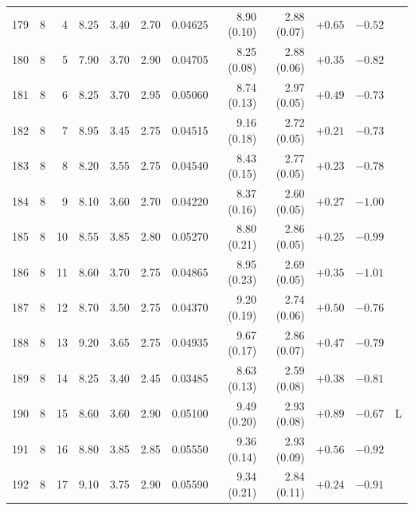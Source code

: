 \begin{longtable}{@{}rrrrrrrrrrrr@{}}
179 & 8 & 4 & \num{8.25} & \num{3.40} & \num{2.70} & \num{0.04625} & \num{8.90} (\num{0.10}) & \num{2.88} (\num{0.07}) & $+\num{0.65}$ & $-\num{0.52}$ &  \\
180 & 8 & 5 & \num{7.90} & \num{3.70} & \num{2.90} & \num{0.04705} & \num{8.25} (\num{0.08}) & \num{2.88} (\num{0.06}) & $+\num{0.35}$ & $-\num{0.82}$ &  \\
181 & 8 & 6 & \num{8.25} & \num{3.70} & \num{2.95} & \num{0.05060} & \num{8.74} (\num{0.13}) & \num{2.97} (\num{0.05}) & $+\num{0.49}$ & $-\num{0.73}$ &  \\
182 & 8 & 7 & \num{8.95} & \num{3.45} & \num{2.75} & \num{0.04515} & \num{9.16} (\num{0.18}) & \num{2.72} (\num{0.05}) & $+\num{0.21}$ & $-\num{0.73}$ &  \\
183 & 8 & 8 & \num{8.20} & \num{3.55} & \num{2.75} & \num{0.04540} & \num{8.43} (\num{0.15}) & \num{2.77} (\num{0.05}) & $+\num{0.23}$ & $-\num{0.78}$ &  \\
184 & 8 & 9 & \num{8.10} & \num{3.60} & \num{2.70} & \num{0.04220} & \num{8.37} (\num{0.16}) & \num{2.60} (\num{0.05}) & $+\num{0.27}$ & $-\num{1.00}$ &  \\
185 & 8 & 10 & \num{8.55} & \num{3.85} & \num{2.80} & \num{0.05270} & \num{8.80} (\num{0.21}) & \num{2.86} (\num{0.05}) & $+\num{0.25}$ & $-\num{0.99}$ &  \\
186 & 8 & 11 & \num{8.60} & \num{3.70} & \num{2.75} & \num{0.04865} & \num{8.95} (\num{0.23}) & \num{2.69} (\num{0.05}) & $+\num{0.35}$ & $-\num{1.01}$ &  \\
187 & 8 & 12 & \num{8.70} & \num{3.50} & \num{2.75} & \num{0.04370} & \num{9.20} (\num{0.19}) & \num{2.74} (\num{0.06}) & $+\num{0.50}$ & $-\num{0.76}$ &  \\
188 & 8 & 13 & \num{9.20} & \num{3.65} & \num{2.75} & \num{0.04935} & \num{9.67} (\num{0.17}) & \num{2.86} (\num{0.07}) & $+\num{0.47}$ & $-\num{0.79}$ &  \\
189 & 8 & 14 & \num{8.25} & \num{3.40} & \num{2.45} & \num{0.03485} & \num{8.63} (\num{0.13}) & \num{2.59} (\num{0.08}) & $+\num{0.38}$ & $-\num{0.81}$ &  \\
190 & 8 & 15 & \num{8.60} & \num{3.60} & \num{2.90} & \num{0.05100} & \num{9.49} (\num{0.20}) & \num{2.93} (\num{0.08}) & $+\num{0.89}$ & $-\num{0.67}$ & L \\
191 & 8 & 16 & \num{8.80} & \num{3.85} & \num{2.85} & \num{0.05550} & \num{9.36} (\num{0.14}) & \num{2.93} (\num{0.09}) & $+\num{0.56}$ & $-\num{0.92}$ &  \\
192 & 8 & 17 & \num{9.10} & \num{3.75} & \num{2.90} & \num{0.05590} & \num{9.34} (\num{0.21}) & \num{2.84} (\num{0.11}) & $+\num{0.24}$ & $-\num{0.91}$ &  \\

\end{longtable}
